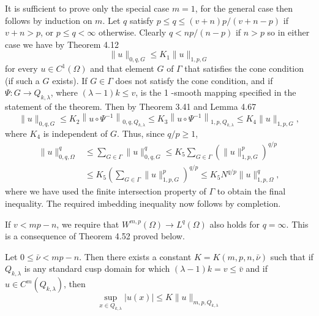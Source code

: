 \begin{para}
  It is sufficient to prove only the special case $m=1$, for the general case then follows by induction on $m$. Let $q$ satisfy $p \leq q \leq(v+n) p /(v+n-p)$ if $v+n>p$, or $p \leq q<\infty$ otherwise. Clearly $q<n p /(n-p)$ if $n>p$ so in either case we have by Theorem 4.12
  \[
  \|u\|_{0, q, G} \leq K_1\|u\|_{1, p, G}
  \]
  for every $u \in C^1(\Omega)$ and that element $G$ of $\Gamma$ that satisfies the cone condition (if such a $G$ exists). If $G \in \Gamma$ does not satisfy the cone condition, and if $\Psi: G \rightarrow Q_{k, \lambda}$, where $(\lambda-1) k \leq v$, is the 1 -smooth mapping specified in the statement of the theorem. Then by Theorem 3.41 and Lemma 4.67
  \[
  \|u\|_{0, q, G} \leq K_2\left\|u \circ \Psi^{-1}\right\|_{0, q, Q_{k, \lambda}} \leq K_3\left\|u \circ \Psi^{-1}\right\|_{1, p, Q_{k, \lambda}} \leq K_4\|u\|_{1, p, G},
  \]
  where $K_4$ is independent of $G$. Thus, since $q / p \geq 1$,
  \[
  \begin{aligned}
  \|u\|_{0, q, \Omega}^q & \leq \sum_{G \in \Gamma}\|u\|_{0, q, G}^q \leq K_5 \sum_{G \in \Gamma}\left(\|u\|_{1, p, G}^p\right)^{q / p} \\
  & \leq K_5\left(\sum_{G \in \Gamma}\|u\|_{1, p, G}^p\right)^{q / p} \leq K_5 N^{q / p}\|u\|_{1, p, \Omega}^q,
  \end{aligned}
  \]
  where we have used the finite intersection property of $\Gamma$ to obtain the final inequality. The required imbedding inequality now follows by completion.
  
  If $v<m p-n$, we require that $W^{m, p}(\Omega) \rightarrow L^q(\Omega)$ also holds for $q=\infty$. This is a consequence of Theorem 4.52 proved below.
\end{para}


\begin{lemma}
  Let $0 \leq \bar{\nu}<m p-n$. Then there exists a constant $K=K(m, p, n, \bar{\nu})$ 
  such that if $Q_{k, \lambda}$ is any standard cusp domain for which $(\lambda-1) k=v \leq \bar{v}$ and if $u \in C^m\left(Q_{k, \lambda}\right)$, then
  \[
  \sup _{x \in Q_{k, \lambda}}|u(x)| \leq K\|u\|_{m, p, Q_{k, \lambda}}
  \]
\end{lemma}

